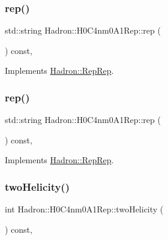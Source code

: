 \subsubsection{\texorpdfstring{rep()}{rep()}\hspace{0.1cm}{\footnotesize\ttfamily [4/5]}}
{\footnotesize\ttfamily std\+::string Hadron\+::\+H0\+C4nm0\+A1\+Rep\+::rep (\begin{DoxyParamCaption}{ }\end{DoxyParamCaption}) const\hspace{0.3cm}{\ttfamily [inline]}, {\ttfamily [virtual]}}



Implements \mbox{\hyperlink{structHadron_1_1RepRep_ab3213025f6de249f7095892109575fde}{Hadron\+::\+Rep\+Rep}}.

\mbox{\label{structHadron_1_1H0C4nm0A1Rep_a30712f6aadf0e0304142526d08c2822e}} 
\subsubsection{\texorpdfstring{rep()}{rep()}\hspace{0.1cm}{\footnotesize\ttfamily [5/5]}}
{\footnotesize\ttfamily std\+::string Hadron\+::\+H0\+C4nm0\+A1\+Rep\+::rep (\begin{DoxyParamCaption}{ }\end{DoxyParamCaption}) const\hspace{0.3cm}{\ttfamily [inline]}, {\ttfamily [virtual]}}



Implements \mbox{\hyperlink{structHadron_1_1RepRep_ab3213025f6de249f7095892109575fde}{Hadron\+::\+Rep\+Rep}}.

\mbox{\label{structHadron_1_1H0C4nm0A1Rep_a24164f53b9067951c0c9fa30be36ca8b}} 
\subsubsection{\texorpdfstring{twoHelicity()}{twoHelicity()}\hspace{0.1cm}{\footnotesize\ttfamily [1/3]}}
{\footnotesize\ttfamily int Hadron\+::\+H0\+C4nm0\+A1\+Rep\+::two\+Helicity (\begin{DoxyParamCaption}{ }\end{DoxyParamCaption}) const\hspace{0.3cm}{\ttfamily [inline]}, {\ttfamily [virtual]}}

